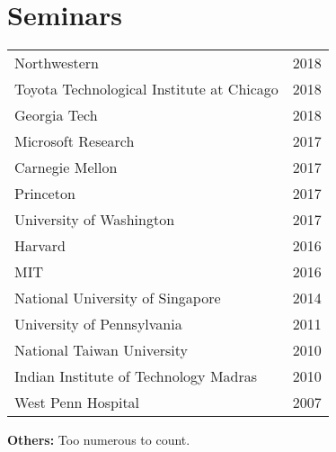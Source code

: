 
\section{Seminars}
\begin{center}
\begin{tabularx}{\linewidth}{Xr}
Northwestern & 2018\\
Toyota Technological Institute at Chicago & 2018\\
Georgia Tech & 2018\\
Microsoft Research & 2017\\
Carnegie Mellon & 2017\\
Princeton & 2017\\
University of Washington & 2017\\
Harvard & 2016\\
MIT & 2016\\
National University of Singapore & 2014\\
University of Pennsylvania & 2011\\
National Taiwan University & 2010\\
Indian Institute of Technology Madras & 2010\\
West Penn Hospital & 2007
\end{tabularx}
\end{center}
\noindent \textbf{Others:} Too numerous to count.
